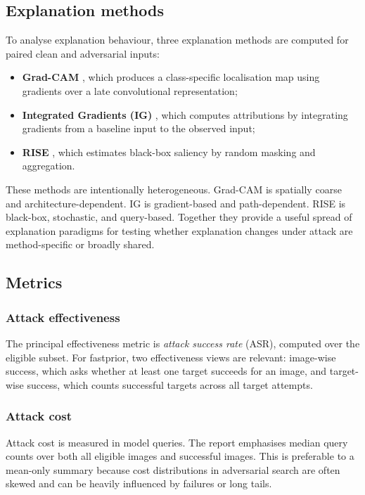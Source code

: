 \subsection{Explanation methods}
To analyse explanation behaviour, three explanation methods are computed for paired clean and adversarial inputs:

\begin{itemize}
  \item \textbf{Grad-CAM} \cite{selvaraju2017gradcam}, which produces a class-specific localisation map using gradients over a late convolutional representation;
  \item \textbf{Integrated Gradients (IG)} \cite{sundararajan2017ig}, which computes attributions by integrating gradients from a baseline input to the observed input;
  \item \textbf{RISE} \cite{petsiuk2018rise}, which estimates black-box saliency by random masking and aggregation.
\end{itemize}

These methods are intentionally heterogeneous.
Grad-CAM is spatially coarse and architecture-dependent.
IG is gradient-based and path-dependent.
RISE is black-box, stochastic, and query-based.
Together they provide a useful spread of explanation paradigms for testing whether explanation changes under attack are method-specific or broadly shared.

\subsection{Metrics}
\subsubsection{Attack effectiveness}
The principal effectiveness metric is \emph{attack success rate} (ASR), computed over the eligible subset.
For fastprior, two effectiveness views are relevant: image-wise success, which asks whether at least one target succeeds for an image, and target-wise success, which counts successful targets across all target attempts.

\subsubsection{Attack cost}
Attack cost is measured in model queries.
The report emphasises median query counts over both all eligible images and successful images.
This is preferable to a mean-only summary because cost distributions in adversarial search are often skewed and can be heavily influenced by failures or long tails.

